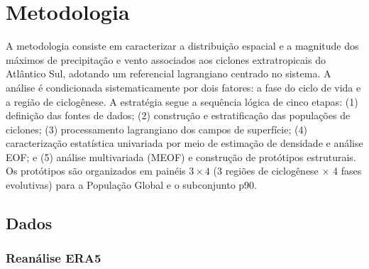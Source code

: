 \chapter{Metodologia}\label{ch:metodologia}



A metodologia consiste em caracterizar a distribuição espacial e a magnitude dos máximos de precipitação e vento associados aos ciclones extratropicais do Atlântico Sul, adotando um referencial lagrangiano centrado no sistema.
A análise é condicionada sistematicamente por dois fatores: a fase do ciclo de vida e a região de ciclogênese.
A estratégia segue a sequência lógica de cinco etapas: (1) definição das fontes de dados; (2) construção e estratificação das populações de ciclones; (3) processamento lagrangiano dos campos de superfície; (4) caracterização estatística univariada por meio de estimação de densidade e análise EOF; e (5) análise multivariada (MEOF) e construção de protótipos estruturais.
Os protótipos são organizados em painéis $3 \times 4$ (3 regiões de ciclogênese $\times$ 4 fases evolutivas) para a População Global e o subconjunto p90.


\section{Dados}\label{sec:datos}

\subsection{Reanálise ERA5}\label{sec:datos_era5}

